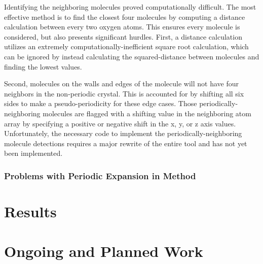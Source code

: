 Identifying the neighboring molecules proved computationally difficult. 
The most effective method is to find the closest four molecules by computing a distance calculation between every two oxygen atoms.
This ensures every molecule is considered, but also presents significant hurdles.
First, a distance calculation utilizes an extremely computationally-inefficient square root calculation, which can be ignored by instead calculating the squared-distance between molecules and finding the lowest values.

Second, molecules on the walls and edges of the molecule will not have four neighbors in the non-periodic crystal. 
This is accounted for by shifting all six sides to make a pseudo-periodicity for these edge cases. 
Those periodically-neighboring molecules are flagged with a shifting value in the neighboring atom array by specifying a positive or negative shift in the x, y, or z axis values. 
Unfortunately, the necessary code to implement the periodically-neighboring molecule detections requires a major rewrite of the entire tool and has not yet been implemented.

\subsubsection{Problems with Periodic Expansion in Method}


\section{Results}

\section{Ongoing and Planned Work}














